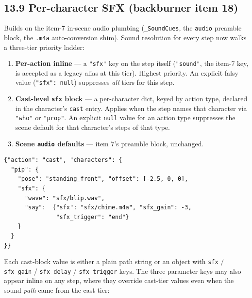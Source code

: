 \documentclass[
  12pt,
  letterpaper,
]{book}
\begin{document}
\subsection{\texorpdfstring{13.9 Per-character SFX (backburner item 18)}{13.9 Per-character SFX}}\label{per-character-sfx}

Builds on the item-7 in-scene audio plumbing (\texttt{\_SoundCues},
the \texttt{audio} preamble block, the \texttt{.m4a} auto-conversion
shim). Sound resolution for every step now walks a three-tier
priority ladder:

\begin{enumerate}
\item
  \textbf{Per-action inline} --- a \texttt{"sfx"} key on the step
  itself (\texttt{"sound"}, the item-7 key, is accepted as a legacy
  alias at this tier). Highest priority. An explicit falsy value
  (\texttt{"sfx": null}) suppresses \emph{all} tiers for this step.
\item
  \textbf{Cast-level \texttt{sfx} block} --- a per-character dict,
  keyed by action type, declared in the character's \texttt{cast}
  entry. Applies when the step names that character via \texttt{"who"}
  or \texttt{"prop"}. An explicit \texttt{null} value for an action
  type suppresses the scene default for that character's steps of
  that type.
\item
  \textbf{Scene \texttt{audio} defaults} --- item 7's preamble block,
  unchanged.
\end{enumerate}

\begin{verbatim}
{"action": "cast", "characters": {
  "pip": {
    "pose": "standing_front", "offset": [-2.5, 0, 0],
    "sfx": {
      "wave": "sfx/blip.wav",
      "say":  {"sfx": "sfx/chime.m4a", "sfx_gain": -3,
               "sfx_trigger": "end"}
    }
  }
}}
\end{verbatim}

Each cast-block value is either a plain path string or an object with
\texttt{sfx} / \texttt{sfx\_gain} / \texttt{sfx\_delay} /
\texttt{sfx\_trigger} keys. The three parameter keys may also appear
inline on any step, where they override cast-tier values even when
the sound \emph{path} came from the cast tier:
\end{document}
